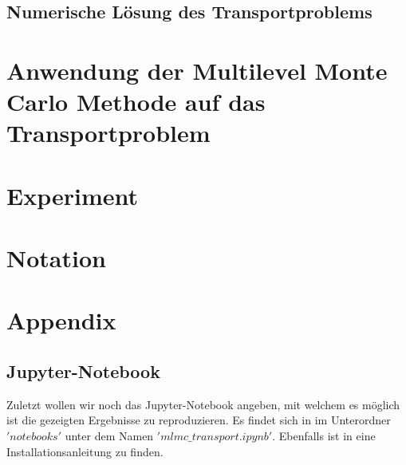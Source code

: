 \documentclass[12pt,a4paper]{scrartcl}
\theoremstyle{definition}
\numberwithin{equation}{section}
\begin{document}
\subsection{Numerische Lösung des Transportproblems}


\newpage  %
\section{Anwendung der Multilevel Monte Carlo Methode auf das Transportproblem}
\label{MLMCTP}

\newpage  %
\section{Experiment}


\newpage  %
\section{Notation}

\newpage  %
\section{Appendix}


\subsection{Jupyter-Notebook}
Zuletzt wollen wir noch das Jupyter-Notebook angeben, mit welchem es möglich ist die gezeigten Ergebnisse zu reproduzieren. Es findet sich in \cite{branchMLMCTP} im Unterordner $'notebooks'$ unter dem Namen $'mlmc\_transport.ipynb'$. Ebenfalls ist in \cite{branchMLMCTP} eine Installationsanleitung zu finden. 


  \newpage

  
  
 
\end{document}

